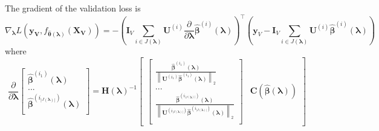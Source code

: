 \documentclass[12pt,letterpaper]{article}
\begin{document}
The gradient of the validation loss is
\begin{equation}
\nabla_{\boldsymbol \lambda} L(\boldsymbol{y_V}, f_{\hat{\boldsymbol{\theta}}(\boldsymbol{\lambda})}(\boldsymbol{X_V})) =
-
\left (
\boldsymbol{I}_V \sum_{i\in J(\boldsymbol\lambda)}  \boldsymbol {U}^{(i)} \frac{\partial}{\partial \boldsymbol\lambda} \hat{\boldsymbol{\beta}}^{(i)}(\boldsymbol{\lambda})
\right )^\top
\left (
\boldsymbol{y}_V - \boldsymbol{I}_V \sum_{i\in J(\boldsymbol\lambda)} \boldsymbol {U}^{(i)} \hat{\boldsymbol{\beta}}^{(i)} (\boldsymbol\lambda)
\right )
\end{equation}
where
\begin{equation}
\frac{\partial}{\partial \boldsymbol{\lambda}} 
\begin{bmatrix}
\hat{\boldsymbol{\beta}}^{(i_1)}(\boldsymbol{\lambda})\\
...\\
\hat{\boldsymbol{\beta}}^{(i_{|J(\boldsymbol{\lambda})|})}(\boldsymbol{\lambda})\\
\end{bmatrix}
= 
\boldsymbol{H}(\boldsymbol\lambda)^{-1}
\begin{bmatrix}
\begin{bmatrix}
\frac{\hat{\boldsymbol{\beta}}^{(i_1)}(\boldsymbol \lambda)}{\left \| \boldsymbol {U}^{(i_1)}  \hat{\boldsymbol{\beta}}^{(i_1)} (\boldsymbol \lambda)\right \|_2}\\
...\\
\frac{\hat{\boldsymbol \beta}^{ 
		\left (i_{|J(\boldsymbol{\lambda})|} \right )} (\boldsymbol \lambda)}{\left \|\boldsymbol {U}^{\left  (i_{|J(\boldsymbol{\lambda})|} \right )} 
	\hat{\boldsymbol{\beta}}^{\left (i_{|J(\boldsymbol{\lambda})|} \right )}(\boldsymbol \lambda)\right \|_2}\\
\end{bmatrix}
&
\boldsymbol C \left (\hat{\boldsymbol \beta}( \boldsymbol \lambda) \right )
\end{bmatrix}
\label{eq:additive_gradient}
\end{equation}
\end{document}
